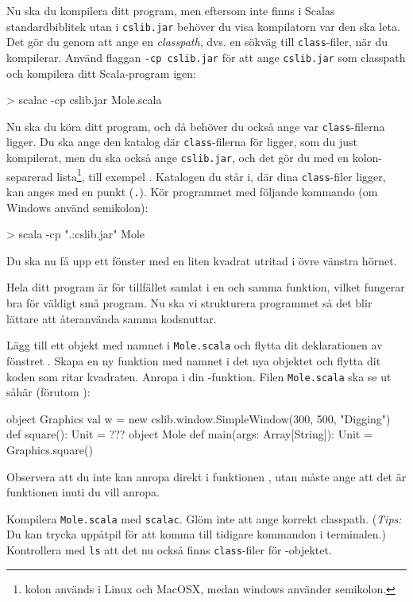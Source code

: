 \Subtask
Nu ska du kompilera ditt program, men eftersom  inte finns i Scalas standardbiblitek utan i \texttt{cslib.jar} behöver du visa kompilatorn var den ska leta.
Det gör du genom att ange en \emph{classpath}, dvs. en sökväg till \texttt{class}-filer, när du kompilerar.
Använd flaggan \texttt{-cp cslib.jar} för att ange \texttt{cslib.jar} som classpath och kompilera ditt Scala-program igen:
\begin{REPLnonum}
> scalac -cp cslib.jar Mole.scala
\end{REPLnonum}

\Subtask
Nu ska du köra ditt program, och då behöver du också ange var \texttt{class}-filerna ligger.
Du ska ange den katalog där \texttt{class}-filerna för  ligger, som du just kompilerat, men du ska också ange \texttt{cslib.jar}, och det gör du med en kolon-separerad lista\footnote{kolon används i Linux och MacOSX, medan windows använder semikolon.}, till exempel .
Katalogen du står i, där dina \texttt{class}-filer ligger, kan anges med en punkt (\texttt{.}).
Kör programmet med följande kommando (om Windows använd semikolon):
\begin{REPLnonum}
> scala -cp ".:cslib.jar" Mole
\end{REPLnonum}
Du ska nu få upp ett fönster med en liten kvadrat utritad i övre vänstra hörnet.


\Task
Hela ditt program är för tillfället samlat i en och samma funktion, vilket fungerar bra för väldigt små program.
Nu ska vi strukturera programmet så det blir lättare att återanvända samma kodsnuttar.

\Subtask
Lägg till ett objekt med namnet  i \texttt{Mole.scala} och flytta dit deklarationen av fönstret .
Skapa en ny funktion med namnet  i det nya objektet och flytta dit koden som ritar kvadraten.
Anropa  i din -funktion.
Filen \texttt{Mole.scala} ska se ut såhär (förutom ):
\begin{Code}
object Graphics {
	val w = new cslib.window.SimpleWindow(300, 500, "Digging")
	def square(): Unit = ???
}
object Mole {
	def main(args: Array[String]): Unit = {
		Graphics.square()
	}
}
\end{Code}
Observera att du inte kan anropa  direkt i funktionen , utan måste ange att det är  funktionen inuti  du vill anropa.

\Subtask
Kompilera \texttt{Mole.scala} med \texttt{scalac}.
Glöm inte att ange korrekt classpath.
(\emph{Tips:} Du kan trycka uppåtpil för att komma till tidigare kommandon i terminalen.)
Kontrollera med \texttt{ls} att det nu också finns \texttt{class}-filer för -objektet.

